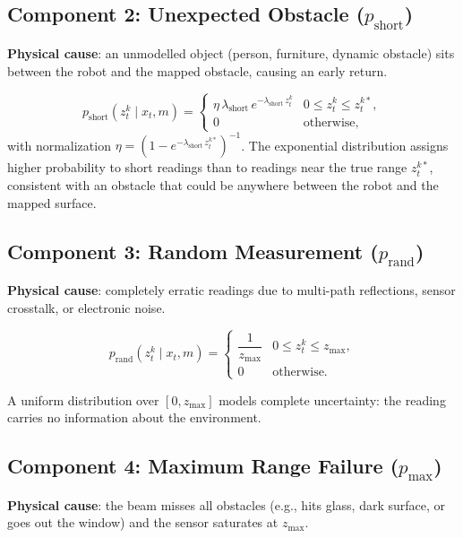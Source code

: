 \documentclass[11pt,a4paper]{article}
\theoremstyle{definition}
\theoremstyle{plain}
\theoremstyle{remark}
\begin{document}
\subsection{Component 2: Unexpected Obstacle ($p_{\mathrm{short}}$)}

\textbf{Physical cause}: an unmodelled object (person, furniture, dynamic obstacle) sits between the robot and the mapped obstacle, causing an early return.

\[
    p_{\mathrm{short}}(z_t^k \mid x_t, m) =
    \begin{cases}
        \eta\,\lambda_{\mathrm{short}}\,e^{-\lambda_{\mathrm{short}}\,z_t^k} & 0 \le z_t^k \le z_t^{k*}, \\
        0 & \text{otherwise,}
    \end{cases}
\]
with normalization $\eta = (1 - e^{-\lambda_{\mathrm{short}}\,z_t^{k*}})^{-1}$. The exponential distribution assigns higher probability to short readings than to readings near the true range $z_t^{k*}$, consistent with an obstacle that could be anywhere between the robot and the mapped surface. %

\subsection{Component 3: Random Measurement ($p_{\mathrm{rand}}$)}

\textbf{Physical cause}: completely erratic readings due to multi-path reflections, sensor crosstalk, or electronic noise.

\[
    p_{\mathrm{rand}}(z_t^k \mid x_t, m) =
    \begin{cases}
        \dfrac{1}{z_{\mathrm{max}}} & 0 \le z_t^k \le z_{\mathrm{max}}, \\[4pt] %
        0 & \text{otherwise.}
    \end{cases}
\]

A uniform distribution over $[0, z_{\mathrm{max}}]$ models complete uncertainty: the reading carries no information about the environment. %

\subsection{Component 4: Maximum Range Failure ($p_{\mathrm{max}}$)} %

\textbf{Physical cause}: the beam misses all obstacles (e.g., hits glass, dark surface, or goes out the window) and the sensor saturates at $z_{\mathrm{max}}$. %
\end{document}
